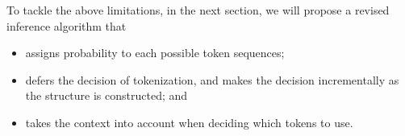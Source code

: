 To tackle the above limitations, in the next section, we will propose
a revised inference algorithm that 
\begin{itemize}
\item assigns probability to each possible token sequences;
\item defers the decision of tokenization, and makes the decision 
      incrementally as the structure is constructed; and
\item takes the context into account when deciding which tokens to use.
\end{itemize}

